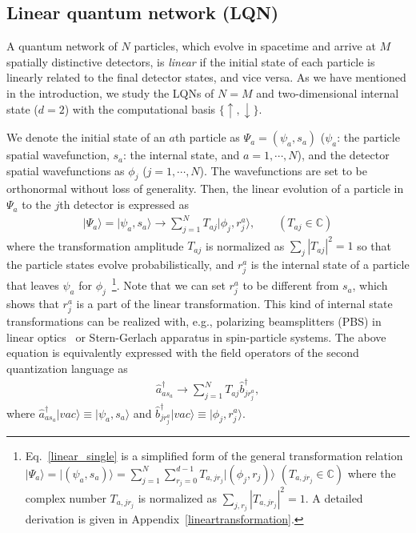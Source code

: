 \documentclass[a4paper,twocolumn,8pt,accepted=2021-12-15]{quantumarticle}
\newcommand{\nn}{\nonumber}
\def\d{\delta}
\def\p{\psi}
\def\P{\Psi}
\def\<{\langle}
\def\>{\rangle}
\def\ha{{\hat{a}}}
\def\hb{{\hat{b}}}
\begin{document}
	\subsection{Linear quantum network (LQN)}
	
	A quantum network of $N$ particles, which evolve in spacetime and arrive at $M$ spatially distinctive detectors, is \emph{linear} if the initial state of each particle is linearly related to the final detector states, and vice versa. As we have mentioned in the introduction, we study the LQNs of $N=M$ and two-dimensional internal state ($d=2$) with the computational basis $\{\uparrow,\downarrow \}$.
	
	We denote the initial state of an $a$th particle as $\P_a = (\p_a, s_a)$ ($\p_a$: the particle spatial wavefunction, $s_a$: the internal state, and $a=1,\cdots, N$), and the detector spatial wavefunctions as $\phi_j$ ($j=1,\cdots, N$). The wavefunctions are set to be orthonormal without loss of generality. 
	Then, the linear evolution of a particle in $\P_a$ to the $j$th detector is expressed as 
	\begin{align}\label{linear_single}
		|\P_a\>=	|\p_a,s_a\> \to  \sum_{j=1}^N T_{aj}|\phi_j, r^a_j\>, \qquad  (T_{aj} \in \mathbb{C})  
	\end{align} where the transformation amplitude $T_{aj}$ is normalized as $\sum_{j}|T_{aj}|^2 =1$ so that the particle states evolve probabilistically, and $r^a_j$ is the internal state of a particle that leaves $\p_a$ for $\phi_j$~\footnote{Eq.~\eqref{linear_single} is a simplified form of the general transformation relation $|\P_a\>=	|(\p_a,s_a)\> = \sum_{j=1}^N\sum_{r_j=0}^{d-1} T_{a,jr_j}|(\phi_j, r_j)\>$ $(T_{a,jr_j} \in \mathbb{C})$ where the complex number $T_{a,jr_j}$ is normalized as $\sum_{j,r_j}|T_{a,jr_j}|^2 =1$. A detailed derivation is given in Appendix~\ref{lineartransformation}. }. Note that we can set $r_j^a$ to be different from $s_a$, which shows that $r_j^a$ is a part of the linear transformation. This kind of internal state transformations can be realized with, e.g., polarizing beamsplitters (PBS) in linear optics~\cite{barros:20,lee2021entangling} or Stern-Gerlach apparatus in spin-particle systems.
	The above equation is equivalently expressed with the field operators of the second quantization language as    
	\begin{align}\label{transf_2ql}
		\ha_{as_a}^\dagger \to
		\sum_{j=1}^N T_{aj}\hat{b}_{jr^a_j}^\dagger,
	\end{align} where $\ha^\dagger_{as_a}|vac\> \equiv |\p_a,s_a\>$ and $\hb^\dagger_{jr^a_j}|vac\> \equiv |\phi_j,r^a_j\>$.
	
\end{document}
